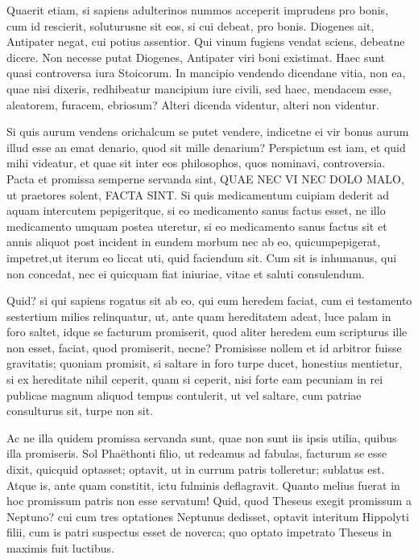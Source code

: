  Quaerit etiam, si sapiens adulterinos nummos acceperit imprudens pro bonis, cum id rescierit, soluturusne sit eos, si cui debeat, pro bonis. Diogenes ait, Antipater negat, cui potius assentior. Qui vinum fugiens vendat sciens, debeatne dicere. Non necesse putat Diogenes, Antipater viri boni existimat. Haec sunt quasi controversa iura Stoicorum. In mancipio vendendo dicendane vitia, non ea, quae nisi dixeris, redhibeatur mancipium iure civili, sed haec, mendacem esse, aleatorem, furacem, ebriosum? Alteri dicenda videntur, alteri non videntur.

 Si quis aurum vendens orichalcum se putet vendere, indicetne ei vir bonus aurum illud esse an emat denario, quod sit mille denarium? Perspictum est iam, et quid mihi videatur, et quae sit inter eos philosophos, quos nominavi, controversia. Pacta et promissa semperne servanda sint, QUAE NEC VI NEC DOLO MALO, ut praetores solent, FACTA SINT. Si quis medicamentum cuipiam dederit ad aquam intercutem pepigeritque, si eo medicamento sanus factus esset, ne illo medicamento umquam postea uteretur, si eo medicamento sanus factus sit et annis aliquot post incident in eundem morbum nec ab eo, quicumpepigerat, impetret,ut iterum eo liccat uti, quid faciendum sit. Cum sit is inhumanus, qui non concedat, nec ei quicquam fiat iniuriae, vitae et saluti consulendum.

 Quid? si qui sapiens rogatus sit ab eo, qui eum heredem faciat, cum ei testamento sestertium milies relinquatur, ut, ante quam hereditatem adeat, luce palam in foro saltet, idque se facturum promiserit, quod aliter heredem eum scripturus ille non esset, faciat, quod promiserit, necne? Promisisse nollem et id arbitror fuisse gravitatis; quoniam promisit, si saltare in foro turpe ducet, honestius mentietur, si ex hereditate nihil ceperit, quam si ceperit, nisi forte eam pecuniam in rei publicae magnum aliquod tempus contulerit, ut vel saltare, cum patriae consulturus sit, turpe non sit.

 Ac ne illa quidem promissa servanda sunt, quae non sunt iis ipsis utilia, quibus illa promiseris. Sol Phaëthonti filio, ut redeamus ad fabulas, facturum se esse dixit, quicquid optasset; optavit, ut in currum patris tolleretur; sublatus est. Atque is, ante quam constitit, ictu fulminis deflagravit. Quanto melius fuerat in hoc promissum patris non esse servatum! Quid, quod Theseus exegit promissum a Neptuno? cui cum tres optationes Neptunus dedisset, optavit interitum Hippolyti filii, cum is patri suspectus esset de noverca; quo optato impetrato Theseus in maximis fuit luctibus.

